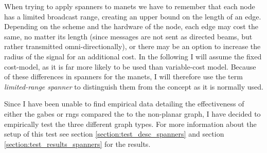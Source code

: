When trying to apply spanners to \acp{manet} we have to remember that each node has a limited broadcast range, creating an upper bound on the length of an edge. Depending on the scheme and the hardware of the node, each edge may cost the same, no matter its length (since messages are not sent as directed beams, but rather transmitted omni-directionally), or there may be an option to increase the radius of the signal for an additional cost. In the following I will assume the fixed cost-model, as it is far more likely to be used than variable-cost model. Because of these differences in spanners for the \acp{manet}, I will therefore use the term \emph{limited-range spanner} to distinguish them from the concept as it is normally used. 

Since I have been unable to find empirical data detailing the effectiveness of either the \acp{gabe} or \acp{rng} compared the to the non-planar graph, I have decided to empirically test the three different graph types. For more information about the setup of this test see section \ref{section:test_desc_spanners} and section \ref{section:test_results_spanners} for the results.
